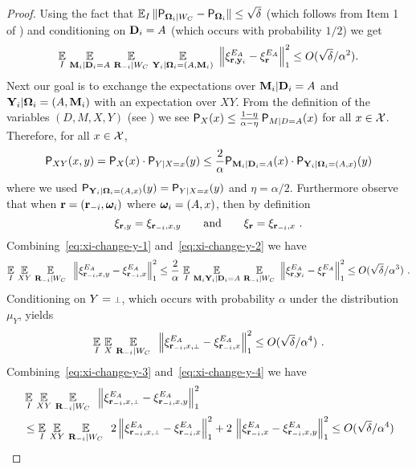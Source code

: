 \begin{proof}
Using the fact that $\Ex_I \| \P_{\bOmega_i | W_C} - \P_{\bOmega_i} \| \leq \sqrt{\delta}$ (which follows from Item 1 of ) and conditioning on $\bD_i = A$ (which occurs with probability $1/2$) we get
\[
	\Ex_I \, \Ex_{\bM_i | \bD_i =A} \, \Ex_{\bR_\mi | W_C} \, \Ex_{\bY_i | \bOmega_i=(A,\bM_i)} \,\, \Big \| \xi^{E_A}_{\br,\by_i} -  \xi^{E_A}_{\br} \Big \|_1^2 \leq O(\sqrt{\delta}/\alpha^2).
\]
Next our goal is to exchange the expectations over $\bM_i | \bD_i = A$ and $\bY_i | \bOmega_i = (A,\bM_i)$ with an expectation over $XY$. From the definition of the variables $(D,M,X,Y)$ (see ) we see $\P_X(x) \leq \frac{1 - \eta}{\alpha - \eta} \, \P_{M|D=A}(x)$ for all $x \in \X$. 
Therefore, for all $x \in \X$,
\begin{equation}
\label{eq:xi-change-y-1}
	\P_{XY}(x,y) = \P_{X}(x) \cdot \P_{Y|X=x}(y) \leq \frac{2}{\alpha} \P_{\bM_i | \bD_i = A}(x) \cdot \P_{\bY_i | \bOmega_i = (A,x)}(y)
\end{equation}
where we used $\P_{\bY_i | \bOmega_i = (A,x)}(y) = \P_{Y|X=x}(y)$ and $\eta = \alpha/2$. Furthermore observe that when $\br = (\br_\mi,\bomega_i)$ where $\bomega_i = (A,x)$, then by definition
\begin{equation}
\label{eq:xi-change-y-2}
	\xi_{\br,y} = \xi_{\br_\mi,x,y} \qquad \text{and} \qquad \xi_{\br} = \xi_{\br_\mi,x}~.
\end{equation}
Combining~\eqref{eq:xi-change-y-1} and~\eqref{eq:xi-change-y-2} we have
\begin{equation}
\label{eq:xi-change-y-3}
	\Ex_I \, \Ex_{XY} \, \Ex_{\bR_\mi | W_C} \, \,\, \Big \| \xi^{E_A}_{\br_\mi,x,y} -  \xi^{E_A}_{\br_\mi,x} \Big \|_1^2 \leq \frac{2}{\alpha} \, \Ex_I \, \Ex_{\bM_i \bY_i | \bD_i =A} \, \Ex_{\bR_\mi | W_C} \,\, \Big \| \xi^{E_A}_{\br,\by_i} -  \xi^{E_A}_{\br} \Big \|_1^2 \leq O(\sqrt{\delta}/\alpha^3)~.
\end{equation}
Conditioning on $Y = \dummy$, which occurs with probability $\alpha$ under the distribution $\mu_Y$, yields
\begin{equation}
\label{eq:xi-change-y-4}
	\Ex_I \, \Ex_{X} \, \Ex_{\bR_\mi | W_C} \, \,\, \Big \| \xi^{E_A}_{\br_\mi,x,\dummy} -  \xi^{E_A}_{\br_\mi,x} \Big \|_1^2 \leq O(\sqrt{\delta}/\alpha^4)~.
\end{equation}
Combining~\eqref{eq:xi-change-y-3} and~\eqref{eq:xi-change-y-4} we have
\begin{align*}
&\Ex_I \, \Ex_{XY} \, \Ex_{\bR_\mi | W_C} \, \,\, \Big \| \xi^{E_A}_{\br_\mi,x,\dummy} -  \xi^{E_A}_{\br_\mi,x,y} \Big \|_1^2 \\&\leq \Ex_I \, \Ex_{XY} \, \Ex_{\bR_\mi | W_C} \, \,\, 2 \, \Big \| \xi^{E_A}_{\br_\mi,x,\dummy} -  \xi^{E_A}_{\br_\mi,x} \Big \|_1^2 + 2 \,\, \Big \| \xi^{E_A}_{\br_\mi,x} -  \xi^{E_A}_{\br_\mi,x,y} \Big \|_1^2  \leq  O(\sqrt{\delta}/\alpha^4)

\end{align*}
\end{proof}
